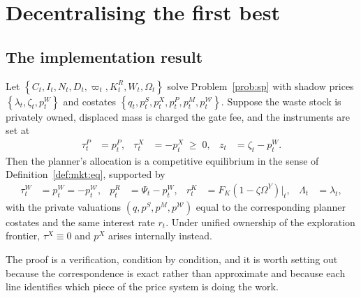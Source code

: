 \section{Decentralising the first best}\label{sec:mkt:impl}

\subsection{The implementation result}\label{sec:mkt:impl:prop}

\begin{proposition}[decentralisation]\label{prop:mkt:impl}
Let $\left\{C_t,I_t,N_t,D_t,\varpi_t,K^R_t,W_t,\Omega_t\right\}$ solve Problem~\ref{prob:sp} with shadow prices $\left\{\lambda_t,\zeta_t,p^W_t\right\}$ and costates $\left\{q_t,p^S_t,p^X_t,p^P_t,p^M_t,p^{\mathcal W}_t\right\}$. Suppose the waste stock is privately owned, displaced mass is charged the gate fee, and the instruments are set at
\begin{align}
\tau^P_t &= p^P_t,
&
\tau^X_t &= -p^X_t\;\ge\;0,
&
z_t &= \zeta_t-p^W_t .
\label{eq:mkt:instruments}
\end{align}
Then the planner's allocation is a competitive equilibrium in the sense of Definition~\ref{def:mkt:eq}, supported by
\begin{align}
\tau^W_t &= p^W_t=-p^{\mathcal W}_t,
&
p^R_t &= \Psi_t-p^W_t,
&
r^K_t &= F_K\left(1-\zeta\Omega^Y\right)\Big|_t,
&
\Lambda_t &= \lambda_t,
\label{eq:mkt:eqprices}
\end{align}
with the private valuations $\left(q,p^S,p^M,p^{\mathcal W}\right)$ equal to the corresponding planner costates and the same interest rate $r_t$. Under unified ownership of the exploration frontier, $\tau^X\equiv0$ and $p^X$ arises internally instead.
\end{proposition}

The proof is a verification, condition by condition, and it is worth setting out because the correspondence is exact rather than approximate and because each line identifies which piece of the price system is doing the work.

